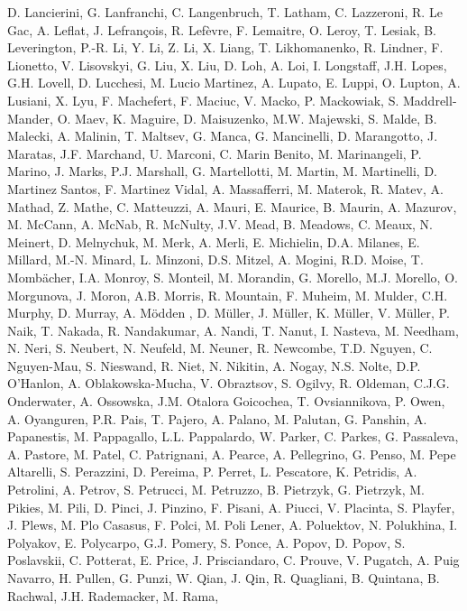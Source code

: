 D. Lancierini,
G. Lanfranchi,
C. Langenbruch,
T. Latham,
C. Lazzeroni,
R. Le Gac,
A. Leflat,
J. Lefran{\c{c}}ois,
R. Lef{\`e}vre,
F. Lemaitre,
O. Leroy,
T. Lesiak,
B. Leverington,
P.-R. Li,
Y. Li,
Z. Li,
X. Liang,
T. Likhomanenko,
R. Lindner,
F. Lionetto,
V. Lisovskyi,
G. Liu,
X. Liu,
D. Loh,
A. Loi,
I. Longstaff,
J.H. Lopes,
G.H. Lovell,
D. Lucchesi,
M. Lucio Martinez,
A. Lupato,
E. Luppi,
O. Lupton,
A. Lusiani,
X. Lyu,
F. Machefert,
F. Maciuc,
V. Macko,
P. Mackowiak,
S. Maddrell-Mander,
O. Maev,
K. Maguire,
D. Maisuzenko,
M.W. Majewski,
S. Malde,
B. Malecki,
A. Malinin,
T. Maltsev,
G. Manca,
G. Mancinelli,
D. Marangotto,
J. Maratas,
J.F. Marchand,
U. Marconi,
C. Marin Benito,
M. Marinangeli,
P. Marino,
J. Marks,
P.J. Marshall,
G. Martellotti,
M. Martin,
M. Martinelli,
D. Martinez Santos,
F. Martinez Vidal,
A. Massafferri,
M. Materok,
R. Matev,
A. Mathad,
Z. Mathe,
C. Matteuzzi,
A. Mauri,
E. Maurice,
B. Maurin,
A. Mazurov,
M. McCann,
A. McNab,
R. McNulty,
J.V. Mead,
B. Meadows,
C. Meaux,
N. Meinert,
D. Melnychuk,
M. Merk,
A. Merli,
E. Michielin,
D.A. Milanes,
E. Millard,
M.-N. Minard,
L. Minzoni,
D.S. Mitzel,
A. Mogini,
R.D. Moise,
T. Momb{\"a}cher,
I.A. Monroy,
S. Monteil,
M. Morandin,
G. Morello,
M.J. Morello,
O. Morgunova,
J. Moron,
A.B. Morris,
R. Mountain,
F. Muheim,
M. Mulder,
C.H. Murphy,
D. Murray,
A. M{\"o}dden ,
D. M{\"u}ller,
J. M{\"u}ller,
K. M{\"u}ller,
V. M{\"u}ller,
P. Naik,
T. Nakada,
R. Nandakumar,
A. Nandi,
T. Nanut,
I. Nasteva,
M. Needham,
N. Neri,
S. Neubert,
N. Neufeld,
M. Neuner,
R. Newcombe,
T.D. Nguyen,
C. Nguyen-Mau,
S. Nieswand,
R. Niet,
N. Nikitin,
A. Nogay,
N.S. Nolte,
D.P. O'Hanlon,
A. Oblakowska-Mucha,
V. Obraztsov,
S. Ogilvy,
R. Oldeman,
C.J.G. Onderwater,
A. Ossowska,
J.M. Otalora Goicochea,
T. Ovsiannikova,
P. Owen,
A. Oyanguren,
P.R. Pais,
T. Pajero,
A. Palano,
M. Palutan,
G. Panshin,
A. Papanestis,
M. Pappagallo,
L.L. Pappalardo,
W. Parker,
C. Parkes,
G. Passaleva,
A. Pastore,
M. Patel,
C. Patrignani,
A. Pearce,
A. Pellegrino,
G. Penso,
M. Pepe Altarelli,
S. Perazzini,
D. Pereima,
P. Perret,
L. Pescatore,
K. Petridis,
A. Petrolini,
A. Petrov,
S. Petrucci,
M. Petruzzo,
B. Pietrzyk,
G. Pietrzyk,
M. Pikies,
M. Pili,
D. Pinci,
J. Pinzino,
F. Pisani,
A. Piucci,
V. Placinta,
S. Playfer,
J. Plews,
M. Plo Casasus,
F. Polci,
M. Poli Lener,
A. Poluektov,
N. Polukhina,
I. Polyakov,
E. Polycarpo,
G.J. Pomery,
S. Ponce,
A. Popov,
D. Popov,
S. Poslavskii,
C. Potterat,
E. Price,
J. Prisciandaro,
C. Prouve,
V. Pugatch,
A. Puig Navarro,
H. Pullen,
G. Punzi,
W. Qian,
J. Qin,
R. Quagliani,
B. Quintana,
B. Rachwal,
J.H. Rademacker,
M. Rama,
